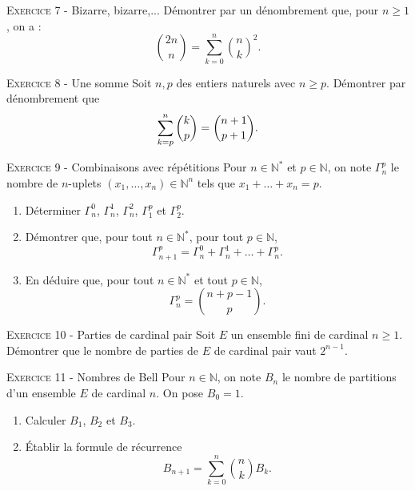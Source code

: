 

\vskip0.3cm\noindent\textsc{Exercice 7} - Bizarre, bizarre,...
\vskip0.2cm
Démontrer par un dénombrement que, pour $n\geq 1$, on a :
$$\binom{2n}{n}=\sum_{k=0}^n \binom{n}{k}^2.$$




\vskip0.3cm\noindent\textsc{Exercice 8} - Une somme
\vskip0.2cm
Soit $n,p$ des entiers naturels avec $n\geq p$. Démontrer par dénombrement que
$$\sum_{k=p}^n \dbinom{k}{p}=\dbinom{n+1}{p+1}.$$




\vskip0.3cm\noindent\textsc{Exercice 9} - Combinaisons avec répétitions
\vskip0.2cm
Pour $n\in\mathbb N^*$ et $p\in\mathbb N$, on note $\Gamma_n^p$ le nombre de $n$-uplets $(x_1,\dots,x_n)\in\mathbb N^n$ tels que $x_1+\dots+x_n=p$. 
\begin{enumerate}
\item Déterminer $\Gamma_n^0$, $\Gamma_n^1$, $\Gamma_n^2$, $\Gamma_1^p$ et $\Gamma_2^p$.
\item Démontrer que, pour tout $n\in\mathbb N^*$, pour tout $p\in\mathbb N$, 
$$\Gamma_{n+1}^p=\Gamma_n^0+\Gamma_n^1+\dots+\Gamma_n^p.$$
\item En déduire que, pour tout $n\in\mathbb N^*$ et tout $p\in\mathbb N$, 
$$\Gamma_n^p=\binom{n+p-1}p.$$
\end{enumerate}




\vskip0.3cm\noindent\textsc{Exercice 10} - Parties de cardinal pair
\vskip0.2cm
Soit $E$ un ensemble fini de cardinal $n\geq 1$. Démontrer que
le nombre de parties de $E$ de cardinal pair vaut $2^{n-1}$.




\vskip0.3cm\noindent\textsc{Exercice 11} - Nombres de Bell
\vskip0.2cm
Pour $n\in\mathbb N$, on note $B_n$ le nombre de partitions d'un ensemble $E$ de cardinal $n$. On pose $B_0=1$.
\begin{enumerate}
 \item Calculer $B_1$, $B_2$ et $B_3$.
 \item \'Etablir la formule de récurrence 
 $$B_{n+1}=\sum_{k=0}^n \binom nk B_k.$$
\end{enumerate}




